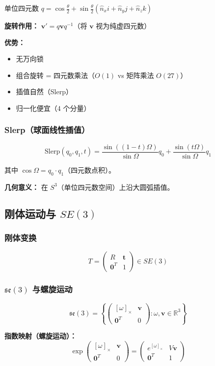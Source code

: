 单位四元数 $q = \cos\frac{\theta}{2} + \sin\frac{\theta}{2}(\hat{n}_x i + \hat{n}_y j + \hat{n}_z k)$

\textbf{旋转作用：} $\mathbf{v}' = q\mathbf{v}q^{-1}$（将 $\mathbf{v}$ 视为纯虚四元数）

\textbf{优势：}
\begin{itemize}
  \item 无万向锁
  \item 组合旋转 = 四元数乘法（$O(1)$ vs 矩阵乘法 $O(27)$）
  \item 插值自然（Slerp）
  \item 归一化便宜（4 个分量）
\end{itemize}

\subsubsection{Slerp（球面线性插值）}

\[
\text{Slerp}(q_0, q_1, t) = \frac{\sin((1-t)\Omega)}{\sin\Omega}q_0 + \frac{\sin(t\Omega)}{\sin\Omega}q_1
\]

其中 $\cos\Omega = q_0 \cdot q_1$（四元数点积）。

\textbf{几何意义：} 在 $S^3$（单位四元数空间）上沿大圆弧插值。

\subsection{刚体运动与 $SE(3)$}

\subsubsection{刚体变换}

\[
T = \begin{pmatrix} R & \mathbf{t} \\ \mathbf{0}^T & 1 \end{pmatrix} \in SE(3)
\]

\subsubsection{$\mathfrak{se}(3)$ 与螺旋运动}

\[
\mathfrak{se}(3) = \left\{\begin{pmatrix} [\omega]_\times & \mathbf{v} \\ \mathbf{0}^T & 0 \end{pmatrix} : \omega, \mathbf{v} \in \mathbb{R}^3\right\}
\]

\textbf{指数映射（螺旋运动）：}
\[
\exp\begin{pmatrix} [\omega]_\times & \mathbf{v} \\ \mathbf{0}^T & 0 \end{pmatrix} = \begin{pmatrix} e^{[\omega]_\times} & V\mathbf{v} \\ \mathbf{0}^T & 1 \end{pmatrix}
\]

